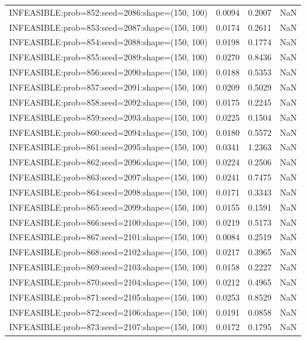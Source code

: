 \begin{longtable}{lccc}
INFEASIBLE:prob=852:seed=2086:shape=(150, 100) &   0.0094 &  0.2007 &    NaN \\
INFEASIBLE:prob=853:seed=2087:shape=(150, 100) &   0.0174 &  0.2611 &    NaN \\
INFEASIBLE:prob=854:seed=2088:shape=(150, 100) &   0.0198 &  0.1774 &    NaN \\
INFEASIBLE:prob=855:seed=2089:shape=(150, 100) &   0.0270 &  0.8436 &    NaN \\
INFEASIBLE:prob=856:seed=2090:shape=(150, 100) &   0.0188 &  0.5353 &    NaN \\
INFEASIBLE:prob=857:seed=2091:shape=(150, 100) &   0.0209 &  0.5029 &    NaN \\
INFEASIBLE:prob=858:seed=2092:shape=(150, 100) &   0.0175 &  0.2245 &    NaN \\
INFEASIBLE:prob=859:seed=2093:shape=(150, 100) &   0.0225 &  0.1504 &    NaN \\
INFEASIBLE:prob=860:seed=2094:shape=(150, 100) &   0.0180 &  0.5572 &    NaN \\
INFEASIBLE:prob=861:seed=2095:shape=(150, 100) &   0.0341 &  1.2363 &    NaN \\
INFEASIBLE:prob=862:seed=2096:shape=(150, 100) &   0.0224 &  0.2506 &    NaN \\
INFEASIBLE:prob=863:seed=2097:shape=(150, 100) &   0.0241 &  0.7475 &    NaN \\
INFEASIBLE:prob=864:seed=2098:shape=(150, 100) &   0.0171 &  0.3343 &    NaN \\
INFEASIBLE:prob=865:seed=2099:shape=(150, 100) &   0.0155 &  0.1591 &    NaN \\
INFEASIBLE:prob=866:seed=2100:shape=(150, 100) &   0.0219 &  0.5173 &    NaN \\
INFEASIBLE:prob=867:seed=2101:shape=(150, 100) &   0.0084 &  0.2519 &    NaN \\
INFEASIBLE:prob=868:seed=2102:shape=(150, 100) &   0.0217 &  0.3965 &    NaN \\
INFEASIBLE:prob=869:seed=2103:shape=(150, 100) &   0.0158 &  0.2227 &    NaN \\
INFEASIBLE:prob=870:seed=2104:shape=(150, 100) &   0.0212 &  0.4965 &    NaN \\
INFEASIBLE:prob=871:seed=2105:shape=(150, 100) &   0.0253 &  0.8529 &    NaN \\
INFEASIBLE:prob=872:seed=2106:shape=(150, 100) &   0.0191 &  0.0858 &    NaN \\
INFEASIBLE:prob=873:seed=2107:shape=(150, 100) &   0.0172 &  0.1795 &    NaN \\

\end{longtable}
